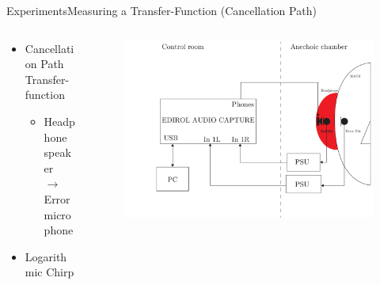 \begin{frame}{Experiments}{Measuring a Transfer-Function (Cancellation Path)}		
	\begin{columns}
		\begin{column}{0.3\textwidth}
			\begin{itemize}
				\item Cancellation Path Transfer-function
				\begin{itemize}
					\item Headphone speaker \\ $\rightarrow$ Error microphone
				\end{itemize}
				\item{Logarithmic Chirp}
			\end{itemize}
		\end{column}
		\begin{column}{0.7\textwidth} 
			\begin{figure}[h]
				\includegraphics[width=1\textwidth]{figures/CancellationPath.pdf}
			\end{figure}
		\end{column}
	\end{columns}
\end{frame}

